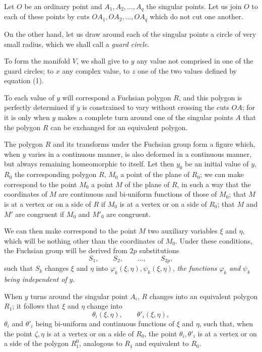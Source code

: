 \documentclass{article}
\begin{document}
Let $O$ be an ordinary point and $A_{1}, A_{2}, \ldots, A_{q}$ the singular points. Let us join $O$ to each of these points by cuts $OA_{1}, OA_{2}, \ldots, OA_{q}$ which do not cut one another.

On the other hand, let us draw around each of the singular points a circle of very small radius, which we shall call a \emph{guard circle}.

To form the manifold $V$, we shall give to $y$ any value not comprised in one of the guard circles; to $x$ any complex value, to $z$ one of the two values defined by equation (1).

To each value of $y$ will correspond a Fuchsian polygon $R$, and this polygon is perfectly determined if $y$ is constrained to vary without crossing the cuts $OA$; for it is only when $y$ makes a complete turn around one of the singular points $A$ that the polygon $R$ can be exchanged for an equivalent polygon.

The polygon $R$ and its transforms under the Fuchsian group form a figure which, when $y$ varies in a continuous manner, is also deformed in a continuous manner, but always remaining homeomorphic to itself. Let then $y_{0}$ be an initial value of $y$, $R_{0}$ the corresponding polygon $R$, $M_{0}$ a point of the plane of $R_{0}$; we can make correspond to the point $M_{0}$ a point $M$ of the plane
of $R$, in such a way that the coordinates of $M$ are continuous and bi-uniform functions of those of $M_{0}$; that $M$ is at a vertex or on a side of $R$ if $M_{0}$ is at a vertex or on a side of $R_{0}$; that $M$ and $M'$ are congruent if $M_{0}$ and $M'_{0}$ are congruent.

We can then make correspond to the point $M$ two auxiliary variables $\xi$ and $\eta$, which will be nothing other than the coordinates of $M_{0}$. Under these conditions, the Fuchsian group will be derived from $2p$ substitutions
\[ S_{1}, \qquad S_{2}, \qquad \ldots, \qquad S_{2p}, \]
such that $S_{k}$ changes $\xi$ and $\eta$ into $\varphi_{k}(\xi, \eta), \psi_{k}(\xi, \eta)$, \emph{the functions} $\varphi_{k}$ \emph{and} $\psi_{k}$ \emph{being independent of} $y$.

When $y$ turns around the singular point $A_{i}$, $R$ changes into an equivalent polygon $R_{1}$; it follows that $\xi$ and $\eta$ change into
\[ \theta_{i}(\xi, \eta), \qquad \theta'_{i}(\xi, \eta), \]
$\theta_{i}$ and $\theta'_{i}$ being bi-uniform and continuous functions of $\xi$ and $\eta$, such that, when the point $\zeta, \eta$ is at a vertex or on a side of $R_{0}$, the point $\theta_{i}, \theta'_{i}$ is at a vertex or on a side of the polygon $R^{0}_{1}$, analogous to $R_{1}$ and equivalent to $R_{0}$.
\end{document}
